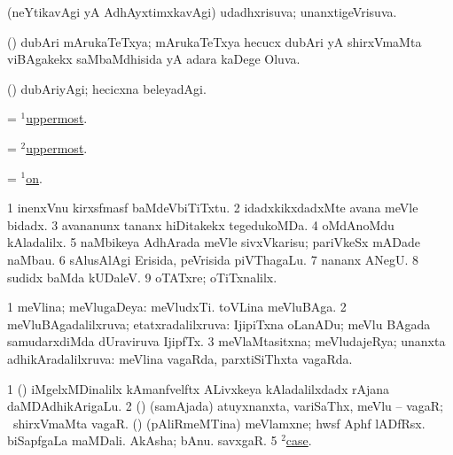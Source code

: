 \bentry
{} 
\gl{\gu}
\expl{}
\bmng
(neYtikavAgi yA AdhAyxtimxkavAgi) udadhxrisuva; unanxtigeVrisuva. 
\emng
\eentry

\bentry
{} 
\gl{\gu}
\expl{}
\bmng
(\birx) dubAri mArukaTeTxya; mArukaTeTxya hecucx dubAri yA shirxVmaMta viBAgakekx saMbaMdhisida yA adara kaDege Oluva. 
\emng
\eentry

\bentry
{} 
\gl{\kirxvi}
\expl{}
\bmng
(\birx) dubAriyAgi; hecicxna beleyadAgi. 
\emng
\eentry

\bentry
{} 
\gl{\gu}
\expl{}
\bmng
= \hyperlink{uppermost(1)}{$^1$uppermost}. 
\emng
\eentry

\bentry
{} 
\gl{\kirxvi}
\expl{}
\bmng
= \hyperlink{uppermost(2)}{$^2$uppermost}. 
\emng
\eentry

\bentry
{} 
\gl{\upa}
\expl{}
\bmng
= \hyperref{kandict_o.pdf}{O}{on(1)}{$^1$on}. 
\emng

\noindent
\gl{\pagu}
\expl{}
\bmng
\bnum
\num{1}  inenxVnu kirxsfmasf baMdeVbiTiTxtu. 
\num{2}  idadxkikxdadxMte avana meVle bidadx. 
\num{3}  avananunx tananx hiDitakekx tegedukoMDa. 
\num{4}  oMdAnoMdu kAladalilx. 
\num{5}  naMbikeya AdhArada meVle sivxVkarisu; pariVkeSx mADade naMbau. 
\num{6}  sAlusAlAgi Erisida, peVrisida piVThagaLu. 
\num{7}  nananx ANegU. 
\num{8}  sudidx baMda kUDaleV. 
\num{9}  oTATxre; oTiTxnalilx. 
\enum
\emng
\eentry

\bentry
{} 
\gl{\gu}
\expl{}
\bmng
\bnum
\num{1} meVlina; meVlugaDeya:  meVludxTi.  toVLina meVluBAga. 
\num{2} meVluBAgadalilxruva; etatxradalilxruva:  IjipiTxna oLanADu; meVlu BAgada samudarxdiMda dUraviruva IjipfTx. 
\num{3} meVlaMtasitxna; meVludajeRya; unanxta adhikAradalilxruva:  meVlina vagaRda, parxtiSiThxta vagaRda. 
\enum
\emng

\noindent
\gl{\pagu}
\expl{}
\bmng
\bnum
\num{1}  (\ca) iMgelxMDinalilx kAmanfvelftx ALivxkeya kAladalilxdadx rAjana daMDAdhikArigaLu. 
\num{2}  (\AmA) (samAjada) atuyxnanxta, variSaThx, meVlu -- vagaR; \kanmu\ shirxVmaMta vagaR. 
  (\birx) 
\banum
{} (pAliRmeMTina) meVlamxne; hwsf Aphf lADfRsx. 
 biSapfgaLa maMDali. 
\eanum
\numie
{}  
\banum
{} AkAsha; bAnu. 
 savxgaR.
\eanum
\numie
\num{5}  \hyperref{kandict_c.pdf}{C}{case(2) pagu(2)}{$^2$case}. 
\enum
\emng
\eentry

